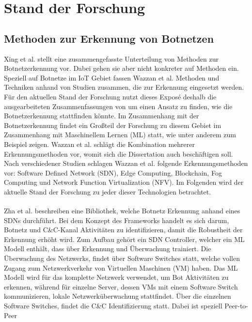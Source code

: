 \section{Stand der Forschung}
\label{sec:research}

\subsection*{Methoden zur Erkennung von Botnetzen}
Xing et al. \cite{Xing2021SurveyOB} stellt eine zusammengefasste Unterteilung von Methoden zur Botnetzerkennung vor. Dabei gehen sie aber nicht konkreter auf Methoden
ein. Speziell auf Botnetze im IoT Gebiet fassen Wazzan et al. \cite{Wazzan2021InternetOT} Methoden und Techniken anhand von Studien zusammen, die zur Erkennung 
eingesetzt werden. Für den aktuellen Stand der Forschung nutzt dieses Exposé deshalb die ausgearbeiteten Zusammenfassungen von \cite{Wazzan2021InternetOT} um einen 
Ansatz zu finden, wie die Botnetzerkennung stattfinden könnte.
Im Zusammenhang mit der Botnetzerkennung findet ein Großteil der Forschung zu diesem Gebiet im Zusammenhang mit Maschinellem Lernen (ML) statt, wie unter anderem zum Beispiel
\cite{SAlrayes2022ModelingOB,DBLP:journals/comcom/Alani22,Habtamu2022ASR, D2022ARO} zeigen. Wazzan et al. schlägt die Kombination 
mehrerer Erkennungsmethoden vor, womit sich die Dissertation auch beschäftigen soll. Nach verschiedener Studien schlagen Wazzan et al. folgende Erkennungsmethoden vor: 
Software Defined Network (SDN), Edge Computing, Blockchain, Fog Computing und Network Function Virtualization (NFV). Im Folgenden wird der aktuelle Stand der Forschung zu jeder dieser 
Technologien betrachtet. \\ \\ Zha et al. \cite{DBLP:conf/cns/Zha0GMC19} beschreiben eine Bibliothek, welche Botnetz Erkennung anhand eines SDNs durchführt. 
Bei dem Konzept des Frameworks handelt es sich darum, Botnetz und C\&C-Kanal Aktivitäten zu identifizieren, damit die Robustheit der Erkennung erhöht wird. Zum Aufbau gehört ein SDN 
Controller, welcher ein ML Modell enthält, dass über Erkennung und Überwachung trainiert. Die Überwachung des Netzwerks, findet über Software Switches statt, welche vollen Zugang zum 
Netzwerkverkehr von Virtuellen Maschinen (VM) haben. Das ML Modell wird für das komplette Netzwerk verwendet, um Bot Aktivitäten zu erkennen, während für einzelne Server, dessen VMs mit 
einem Software Switch kommunizieren, lokale Netzwerküberwachung stattfindet. Über die einzelnen Software Switches, findet die C\&C Identifizierung statt. Dabei ist speziell Peer-to-Peer 
